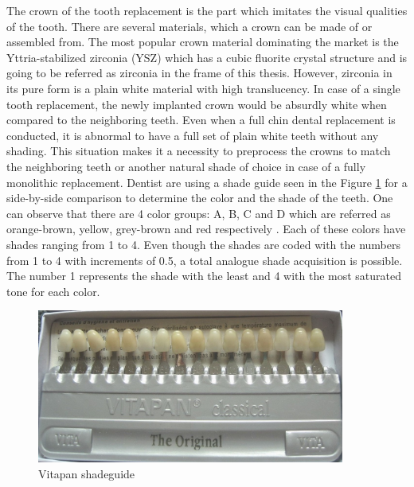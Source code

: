 \bigskip

 
 The crown of the tooth replacement is the part which imitates the visual qualities of the tooth. There are several materials, which a crown can be made of or assembled from. The most popular crown material dominating the market is the Yttria-stabilized zirconia (YSZ) which has a cubic fluorite crystal structure and is going to be referred as zirconia in the frame of this thesis. However, zirconia in its pure form is a plain white material with high translucency. In case of a single tooth replacement, the newly implanted crown would be absurdly white when compared to the neighboring teeth. Even when a full chin dental replacement is conducted, it is abnormal to have a full set of plain white teeth without any shading. This situation makes it a necessity to preprocess the crowns to match the neighboring teeth or another natural shade of choice in case of a fully monolithic replacement. Dentist are using a shade guide seen in the Figure \ref{fig:shadeguide} for a side-by-side comparison to determine the color and the shade of the teeth. One can observe that there are 4 color groups: A, B, C and D which are referred as orange-brown, yellow, grey-brown and red respectively \citep{vita}. Each of these colors have shades ranging from 1 to 4. Even though the shades are coded with the numbers from 1 to 4 with increments of 0.5, a total analogue shade acquisition is possible. The number 1 represents the shade with the least and 4 with the most saturated tone for each color.

\bigskip

 \begin{figure}[H]
 	\centering
 	\includegraphics[width=0.9\textwidth]{grafiken/shadeguide.jpg}
 	\caption{Vitapan shadeguide}
 	\label{fig:shadeguide}
 \end{figure}  
  
 \bigskip
 



